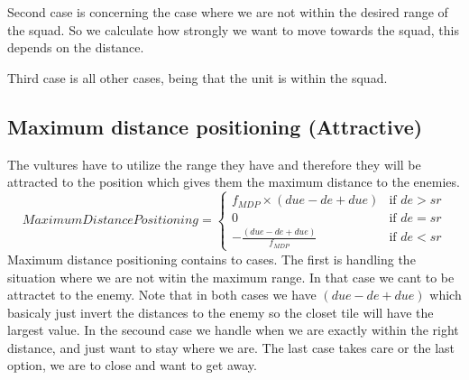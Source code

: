 		Second case  is concerning the case where we are not within the desired range of the squad. So we calculate how strongly we want to move towards the squad, this depends on the distance. 
		
		Third case is all other cases, being that the unit is within the squad.
					
	\subsection*{Maximum distance positioning (Attractive)}
		The vultures have to utilize the range they have and therefore they will be attracted to the position which gives them the maximum distance 
		to the enemies.
		\begin{displaymath}
			MaximumDistancePositioning = \begin{cases}
					f_{MDP} \times (due - de + due) & \text{if } de > sr\\
					0 & \text{if } de = sr\\
					- \frac{(due - de + due)}{f_{MDP}} & \text{if } de < sr
				\end{cases}		
		\end{displaymath}
		Maximum distance positioning contains to cases. The first is handling the situation where we are not witin the maximum range. In that case we cant to be attractet to the enemy. Note that in both cases we have $(due - de + due)$ which basicaly just invert the distances to the enemy so the closet tile will have the largest value.
		In the secound case we handle when we are exactly within the right distance, and just want to stay where we are.
		The last case takes care or the last option, we are to close and want to get away.
		
		
		
